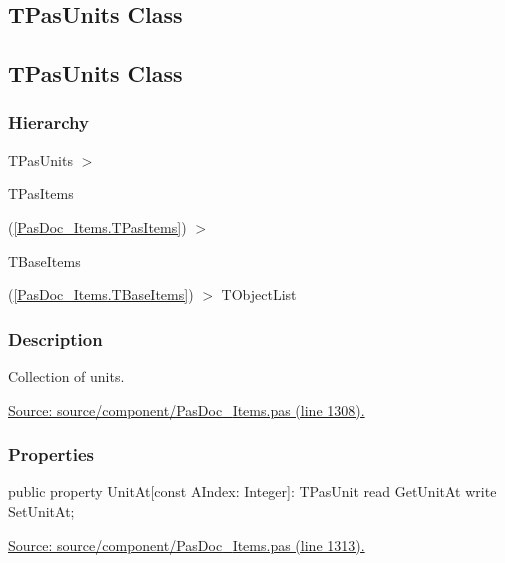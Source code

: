 \documentclass{report}
\newif\ifpdf
\begin{document}
\subsection*{\large{\textbf{TPasUnits Class}}\normalsize\hspace{1ex}\hrulefill}
\else
\subsection*{TPasUnits Class}
\fi
\label{PasDoc_Items.TPasUnits}
\subsubsection*{\large{\textbf{Hierarchy}}\normalsize\hspace{1ex}\hfill}
TPasUnits {$>$} \begin{ttfamily}TPasItems\end{ttfamily}(\ref{PasDoc_Items.TPasItems}) {$>$} \begin{ttfamily}TBaseItems\end{ttfamily}(\ref{PasDoc_Items.TBaseItems}) {$>$} 
TObjectList
\subsubsection*{\large{\textbf{Description}}\normalsize\hspace{1ex}\hfill}
Collection of units.\par
\href{https://github.com/pasdoc/pasdoc/blob/master/source/component/PasDoc_Items.pas#L1308}{Source: source/component/PasDoc{\_}Items.pas (line 1308).}\subsubsection*{\large{\textbf{Properties}}\normalsize\hspace{1ex}\hfill}
\begin{list}{}{
\setlength{\itemindent}{0cm}
\setlength{\listparindent}{0cm}
\setlength{\leftmargin}{\evensidemargin}
\addtolength{\leftmargin}{\tmplength}
\settowidth{\labelsep}{X}
\addtolength{\leftmargin}{\labelsep}
\setlength{\labelwidth}{\tmplength}
}
\label{PasDoc_Items.TPasUnits-UnitAt}
\item[\textbf{UnitAt}\hfill]
\ifpdf
\begin{flushleft}
\fi
\begin{ttfamily}
public property UnitAt[const AIndex: Integer]: TPasUnit
      read GetUnitAt
      write SetUnitAt;\end{ttfamily}

\ifpdf
\end{flushleft}
\fi


\par  \par
\href{https://github.com/pasdoc/pasdoc/blob/master/source/component/PasDoc_Items.pas#L1313}{Source: source/component/PasDoc{\_}Items.pas (line 1313).}\end{list}
\end{document}

